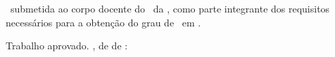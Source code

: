 

% 

\begin{folhadeaprovacao}
    \ABNTEXchapterfont%
    \center%

    {%
        \large
        \MakeUppercase{\ValorDoNomeCompletoDoAutor{}}
    }
    \vspace*{\fill}

    {%
        \Large
        \textbf{\MakeUppercase{\ValorDoTitulo{}}}%
        \par
        \ifDefinidoSubtitulo%
            \ValorDoSubtitulo{}%
            \par
        \fi
    }
    \vspace*{\fill}

    \hspace{.45\textwidth}
    \begin{minipage}{.5\textwidth}
        \ValorDoTipo{}\ submetida ao corpo docente do \ValorDaUnidadeAcademica{}\ da \ValorDaInstituicao{}, como
        parte integrante dos requisitos necess\'arios para a obten\c{c}\~ao do grau de \ValorDoGrau{}\ em \ValorDoCurso{}.
    \end{minipage}%
    \vspace*{\fill}

    {%
        Trabalho aprovado. \ValorDaCidade{}, \ValorDoDia{} de \ValorDoMes{} de \ValorDoAno{}:
    }

    \begin{multicols}{2}
        \setlength{\ABNTEXsignwidth}{7cm}%
    \end{multicols}


\end{folhadeaprovacao}
